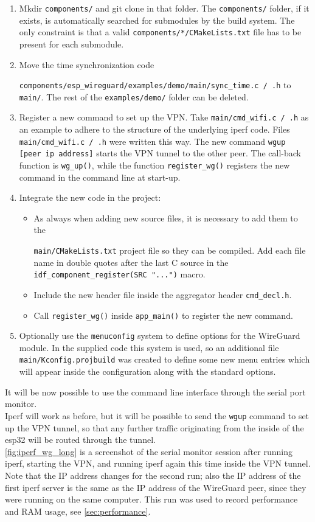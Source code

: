 \begin{enumerate}
    \item Mkdir \texttt{components/} and git clone \cite{wg_trombik} in that folder. The \texttt{components/} folder, if it exists, is automatically searched for submodules by the build system. The only constraint is that a valid \texttt{components/*/CMakeLists.txt} file has to be present for each submodule.
    \item Move the time synchronization code
    
    \texttt{components/esp\_wireguard/examples/demo/main/sync\_time.c / .h} to \texttt{main/}. The rest of the \texttt{examples/demo/} folder can be deleted.
    \item Register a new command to set up the VPN. Take \texttt{main/cmd\_wifi.c / .h} as an example to adhere to the structure of the underlying iperf code. Files \texttt{main/cmd\_wifi.c / .h} were written this way. The new command \texttt{wgup [peer ip address]} starts the VPN tunnel to the other peer. The call-back function is \texttt{wg\_up()}, while the function \texttt{register\_wg()} registers the new command in the command line at start-up.
    \item Integrate the new code in the project:
    \begin{itemize}
        \item As always when adding new source files, it is necessary to add them to the
        
        \texttt{main/CMakeLists.txt} project file so they can be compiled. Add each file name in double quotes after the last C source in the \texttt{idf\_component\_register(SRC "...")} macro.
        \item Include the new header file inside the aggregator header \texttt{cmd\_decl.h}.
        \item Call \texttt{register\_wg()} inside \texttt{app\_main()} to register the new command.
    \end{itemize}
    \item Optionally use the \texttt{menuconfig} system to define options for the WireGuard module. In the supplied code this system is used, so an additional file \texttt{main/Kconfig.projbuild} was created to define some new menu entries which will appear inside the configuration along with the standard options.
\end{enumerate}

It will be now possible to use the command line interface through the serial port monitor.\\
Iperf will work as before, but it will be possible to send the \texttt{wgup} command to set up the VPN tunnel, so that any further traffic originating from the inside of the esp32 will be routed through the tunnel.\\
\ref{fig:iperf_wg_long} is a screenshot of the serial monitor session after running iperf, starting the VPN, and running iperf again this time inside the VPN tunnel. Note that the IP address changes for the second run; also the IP address of the first iperf server is the same as the IP address of the WireGuard peer, since they were running on the same computer.
This run was used to record performance and RAM usage, see \ref{sec:performance}.

